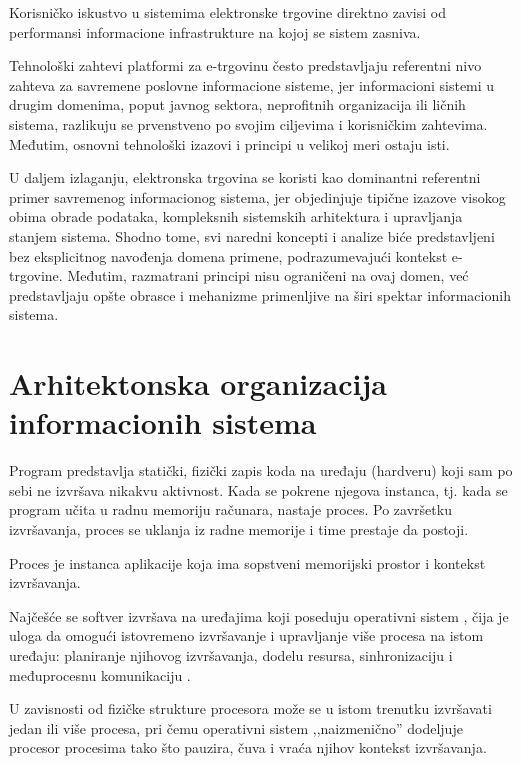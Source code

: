 \begin{posledica}
Korisničko iskustvo u sistemima elektronske trgovine direktno zavisi od performansi informacione infrastrukture na kojoj se sistem zasniva.
\end{posledica}

Tehnološki zahtevi platformi za e-trgovinu često predstavljaju referentni nivo zahteva za savremene poslovne informacione sisteme, jer informacioni sistemi u drugim domenima, poput javnog sektora, neprofitnih organizacija ili ličnih sistema, razlikuju se prvenstveno po svojim ciljevima i korisničkim zahtevima. Međutim, osnovni tehnološki izazovi i principi u velikoj meri ostaju isti.

U daljem izlaganju, elektronska trgovina se koristi kao dominantni referentni primer savremenog informacionog sistema, jer objedinjuje tipične izazove visokog obima obrade podataka, kompleksnih sistemskih arhitektura i upravljanja stanjem sistema. Shodno tome, svi naredni koncepti i analize biće predstavljeni bez eksplicitnog navođenja domena primene, podrazumevajući kontekst e-trgovine. Međutim, razmatrani principi nisu ograničeni na ovaj domen, već predstavljaju opšte obrasce i mehanizme primenljive na širi spektar informacionih sistema.

\section{Arhitektonska organizacija informacionih sistema}
Program predstavlja statički, fizički zapis koda na uređaju (hardveru) koji sam po sebi ne izvršava nikakvu aktivnost. Kada se pokrene njegova instanca, tj. kada se program učita u radnu memoriju računara, nastaje proces. Po završetku izvršavanja, proces se uklanja iz radne memorije i time prestaje da postoji.

\begin{definicija}
Proces je instanca aplikacije koja ima sopstveni memorijski prostor i kontekst izvršavanja.
\end{definicija}

Najčešće se softver izvršava na uređajima koji poseduju operativni sistem \cite{tanenbaum2015modern}, čija je uloga da omogući istovremeno izvršavanje i upravljanje više procesa na istom uređaju: planiranje njihovog izvršavanja, dodelu resursa, sinhronizaciju i međuprocesnu komunikaciju .

U zavisnosti od fizičke strukture procesora može se u istom trenutku izvršavati jedan ili više procesa, pri čemu operativni sistem ,,naizmenično'' dodeljuje procesor procesima tako što pauzira, čuva i vraća njihov kontekst izvršavanja.

